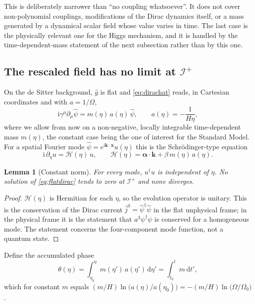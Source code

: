 \documentclass[11pt,a4paper]{article}
\newtheorem{lemma}{Lemma}
\theoremstyle{definition}
\newcommand{\scri}{\mathscr{I}^{+}}
\newcommand{\dd}{\mathrm{d}}
\newcommand{\ii}{\mathrm{i}}
\newcommand{\hg}{\hat g}
\newcommand{\hpsi}{\hat\psi}
\begin{document}
This is deliberately narrower than ``no coupling whatsoever''. It does not cover non-polynomial couplings, modifications of the Dirac dynamics itself, or a mass generated by a dynamical scalar field whose value varies in time. The last case is the physically relevant one for the Higgs mechanism, and it is handled by the time-dependent-mass statement of the next subsection rather than by this one.

\subsection{The rescaled field has no limit at \texorpdfstring{$\scri$}{scri+}}

On the de Sitter background, $\hg$ is flat and \eqref{eq:dirachat} reads, in Cartesian coordinates and with $a=1/\Omega$,
\begin{equation}
\ii\gamma^{\mu}\partial_{\mu}\hpsi=m(\eta)\,a(\eta)\,\hpsi,\qquad a(\eta)=-\frac{1}{H\eta},
\label{eq:flatdirac}
\end{equation}
where we allow from now on a non-negative, locally integrable time-dependent mass $m(\eta)$, the constant case being the one of interest for the Standard Model. For a spatial Fourier mode $\hpsi=e^{\ii\mathbf{k}\cdot\mathbf{x}}u(\eta)$ this is the Schr\"odinger-type equation
\begin{equation}
\ii\,\partial_{\eta}u=\mathcal{H}(\eta)\,u,\qquad \mathcal{H}(\eta)=\boldsymbol\alpha\cdot\mathbf{k}+\beta\,m(\eta)\,a(\eta).
\label{eq:hk}
\end{equation}

\begin{lemma}[Constant norm]
\label{lem:norm}
For every mode, $u^{\dagger}u$ is independent of $\eta$. No solution of \eqref{eq:flatdirac} tends to zero at $\scri$ and none diverges.
\end{lemma}
\begin{proof}
$\mathcal{H}(\eta)$ is Hermitian for each $\eta$, so the evolution operator is unitary. This is the conservation of the Dirac current $\hat j^{0}=\hpsi^{\dagger}\hpsi$ in the flat unphysical frame; in the physical frame it is the statement that $a^{3}\psi^{\dagger}\psi$ is conserved for a homogeneous mode. The statement concerns the four-component mode function, not a quantum state.
\end{proof}

Define the accumulated phase
\begin{equation}
\theta(\eta)=\int_{\eta_{0}}^{\eta}m(\eta')\,a(\eta')\,\dd\eta'=\int_{t_{0}}^{t}m\,\dd t' ,
\label{eq:theta}
\end{equation}
which for constant $m$ equals $(m/H)\ln\big(a(\eta)/a(\eta_{0})\big)=-(m/H)\ln\big(\Omega/\Omega_{0}\big)$.
\end{document}
